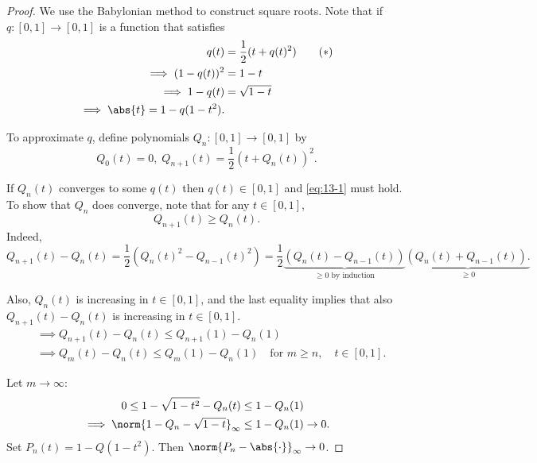 \documentclass{article}
\begin{document}
\begin{proof}
    We use the Babylonian method to construct square roots.
    Note that if $q : [0, 1] \to [0, 1]$ is a function that satisfies
    \begin{align*}
        q(t) &= \frac{1}{2}(t + q(t)^2) \tag{$*$} \label{eq:13-1} \\
        \implies (1-q(t))^2 &= 1-t \\
        \implies 1 - q(t) &= \sqrt{1 - t} \\
        \implies \abs{t} = 1 - q(1-t^2).
    \end{align*}

    To approximate $q$, define polynomials $Q_n : [0, 1] \to [0, 1]$ by
    \begin{equation*}
        Q_0(t) = 0, \; Q_{n+1}(t) = \frac{1}{2}(t + Q_n(t))^2.
    \end{equation*}

    If $Q_n(t)$ converges to some $q(t)$ then $q(t) \in [0, 1]$ and \eqref{eq:13-1} must hold.
    To show that $Q_n$ does converge, note that for any $t \in [0, 1]$,
    \begin{equation*}
        Q_{n+1}(t) \geq Q_n(t).
    \end{equation*}
    Indeed,
    \begin{equation*}
        Q_{n+1}(t) - Q_n(t) = \frac{1}{2} \left(Q_n(t)^2 - Q_{n-1}(t)^2\right) = \frac{1}{2}\underbrace{(Q_n(t) - Q_{n-1}(t))}_{\geq 0 \text{ by induction}} \underbrace{(Q_n(t) + Q_{n-1}(t)).}_{\geq 0}
    \end{equation*}

    Also, $Q_n(t)$ is increasing in $t \in [0, 1]$, and the last equality implies that also $Q_{n+1}(t) - Q_n(t)$ is increasing in $t \in [0, 1]$.
    \begin{align*}
        &\implies Q_{n+1}(t) - Q_n(t) \leq Q_{n+1}(1) - Q_n(1) \\
        &\implies Q_m(t) - Q_n(t) \leq Q_m(1) - Q_n(1) \quad \text{for } m \geq n, \quad t \in [0, 1].
    \end{align*}

    Let $m \to \infty$:
    \begin{align*}
        0 \leq 1 - \sqrt{1 - t^2} - Q_n(t) &\leq 1 - Q_n(1) \\
        \implies \norm{1 - Q_n - \sqrt{1-t}}_\infty &\leq 1 - Q_n(1) \to 0.
    \end{align*}
    Set $P_n(t) = 1 - Q(1-t^2)$. Then $\norm{P_n - \abs{\cdot}}_\infty \to 0$.
\end{proof}
\end{document}
